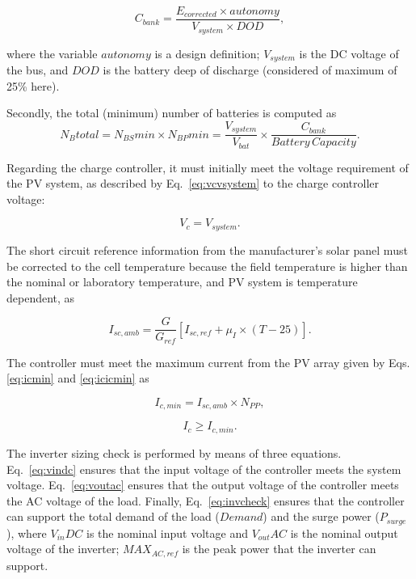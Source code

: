 \documentclass[runningheads]{llncs}
\begin{document}
\begin{equation}
\label{eq:Cbank}
C_{bank} = \frac{E_{corrected} \times autonomy}{V_{system} \times DOD},
\end{equation}

\noindent where the variable $autonomy$ is a design definition; %
$ V_{system} $ is the DC voltage of the bus, and $ DOD $ is the battery deep of discharge (considered of maximum of 25\% here).

Secondly, the total (minimum) number of batteries is computed as 
\begin{equation}
\label{eq:Nbtotal}
N_{B}total = N_{BS}min \times N_{BP}min = \frac{V_{system}}{V_{bat}} \times \frac{C_{bank}}{Battery \, Capacity}.
\end{equation}

Regarding the charge controller, it must initially meet the voltage requirement of the PV system, as described by Eq.~\ref{eq:vcvsystem} to the charge controller voltage: 

\begin{equation}
\label{eq:vcvsystem}
V_{c} = V_{system}.
\end{equation}

The short circuit reference information from the manufacturer's solar panel must be corrected to the cell temperature because the field temperature is higher than the nominal or laboratory temperature, and PV system is temperature dependent, as 

\begin{equation}
\label{eq:iscamb}
I_{sc,amb} = \frac{G}{G_{ref}} \left[I_{sc,ref} +  \mu_{I} \times (T-25) \right]. 
\end{equation}

The controller must meet the maximum current from the PV array given by Eqs. \ref{eq:icmin} and \ref{eq:icicmin} as

\begin{equation}
\label{eq:icmin}
I_{c,min} = I_{sc,amb} \times N_{PP},
\end{equation}

\begin{equation}
\label{eq:icicmin}
I_{c} \geq I_{c,min}.
\end{equation}

The inverter sizing check is performed by means of three equations. Eq.~\ref{eq:vindc} ensures that the input voltage of the controller meets the system voltage. Eq.~\ref{eq:voutac} ensures that the output voltage of the controller meets the AC voltage of the load. Finally, Eq.~\ref{eq:invcheck} ensures that the controller can support the total demand of the load ($Demand$) and the surge power ($P_{surge}$), where $V_{in}DC$ is the nominal input voltage and $V_{out}AC$ is the nominal output voltage of the inverter; $MAX_{AC,ref}$ is the peak power that the inverter can support.
\end{document}
